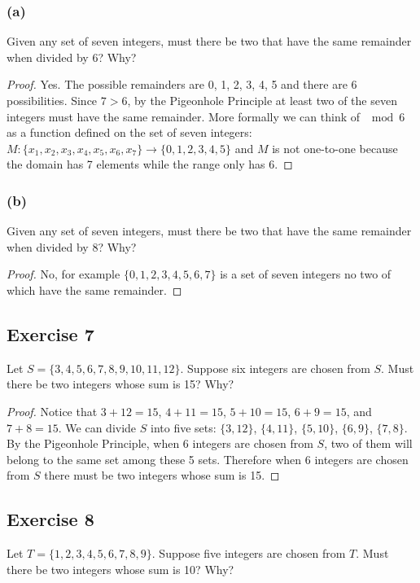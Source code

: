 \documentclass[14pt]{extarticle}
\begin{document}
\subsubsection{(a)}
Given any set of seven integers, must there be two that have the same remainder when divided by 6? Why?

\begin{proof}
Yes. The possible remainders are 0, 1, 2, 3, 4, 5 and there are 6 possibilities. Since \(7 > 6\), by the Pigeonhole 
Principle at least two of the seven integers must have the same remainder. More formally we can think of \(\mod 6\) as 
a function defined on the set of seven integers: \(M: \{x_1 ,x_2,x_3,x_4 , x_5 , x_6 , x_7\} \to \{0, 1, 2, 3, 4, 5\}\) 
and \(M\) is not one-to-one because the domain has 7 elements while the range only has 6.
\end{proof}

\subsubsection{(b)}
Given any set of seven integers, must there be two that have the same remainder when divided by 8? Why?

\begin{proof}
No, for example \(\{0, 1, 2, 3, 4, 5, 6, 7\}\) is a set of seven integers no two of which have the same remainder.
\end{proof}

\subsection{Exercise 7}
Let \(S = \{3, 4, 5, 6, 7, 8, 9, 10, 11, 12\}\). Suppose six integers are chosen from \(S\). Must there be two 
integers whose sum is 15? Why?

\begin{proof}
Notice that \(3 + 12 = 15\), \(4 + 11 = 15\), \(5 + 10 = 15\), \(6 + 9 = 15\), and \(7 + 8 = 15\). We can divide \(S\) into 
five sets: \(\{3, 12\}\), \(\{4, 11\}\), \(\{5, 10\}\), \(\{6, 9\}\), \(\{7, 8\}\). By the Pigeonhole Principle, when 6 
integers are chosen from \(S\), two of them will belong to the same set among these 5 sets. Therefore when 6 integers are 
chosen from \(S\) there must be two integers whose sum is 15.
\end{proof}

\subsection{Exercise 8}
Let \(T = \{1, 2, 3, 4, 5, 6, 7, 8, 9\}\). Suppose five integers are chosen from \(T\). Must there be two integers 
whose sum is 10? Why?
\end{document}
